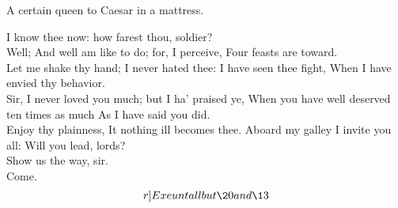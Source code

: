\documentclass{book}
\begin{document}
	A certain queen to Caesar in a mattress.

	I know thee now: how farest thou, soldier? \\

	Well;
	And well am like to do; for, I perceive,
	Four feasts are toward. \\

	Let me shake thy hand;
	I never hated thee: I have seen thee fight,
	When I have envied thy behavior. \\

	Sir,
	I never loved you much; but I ha' praised ye,
	When you have well deserved ten times as much
	As I have said you did. \\

	Enjoy thy plainness,
	It nothing ill becomes thee.
	Aboard my galley I invite you all:
	Will you lead, lords? \\

\3 \1   Show us the way, sir. \\

	Come. \[r]Exeunt all but \20 and \13\]
\end{document}
